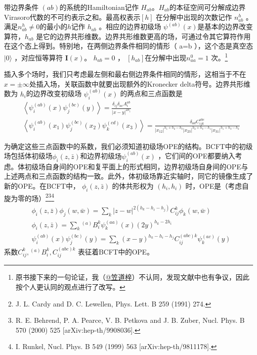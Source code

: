 带边界条件 $(ab) $的系统的Hamiltonian记作 $H_{a b} $。$ H_{ab} $的本征空间可分解成边界Virasoro代数的不可约表示之和。最高权表示$ [h]$ 在分解中出现的次数记作 $n_{a b}^{h}$ 。满足$ n_{a b}^{h} \neq 0 $的最小的$ h $记作 $h_{ab}$ 。相应的边界初级场 $\psi^{(a b)}(x) $是基本的边界改变算符，$ h_{ab}$ 是它的边界共形维数。边界共形维数更高的场，可通过令其它算符作用在这个态上得到。特别地，在两侧边界条件相同的情形（ a=b ），这个态是真空态 $|0\rangle$ ，对应恒等算符 $\boldsymbol{I}(x) $。 $h_{ab}=0$ ， $[h_{ab}] $在分解中出现$ n_{a a}^{0}=1$ 次。\footnote{原书接下来的一句论证，我（\href{https://www.zhihu.com/people/wo-bei-56}{@笠道梓}）不认同，发现文献中也有争议，因此按个人更认同的观点进行了改写。}

插入多个场时，我们只考虑最左侧和最右侧边界条件相同的情形，这相当于不在 $x=\pm \infty $处插入场，关联函数中就要出现额外的Kronecker delta符号。边界共形维数为 $h_i $的边界改变初级场 $\psi_{i}^{(a b)}(x)$ 的两点和三点函数是
\begin{align} &\left\langle\psi_{i}^{(a b)}(x) \psi_{j}^{(b c)}(y)\right\rangle=\frac{\delta_{i j} \delta_{a c} A_{i}^{a b}}{|x-y|^{2 h_{i}}}\\ &\left\langle\psi_{i}^{(a b)}\left(x_{1}\right) \psi_{j}^{(b c)}\left(x_{2}\right) \psi_{k}^{(c d)}\left(x_{3}\right)\right\rangle=\frac{\delta_{a d} C_{i j k}^{a b c}}{\left|x_{12}\right|^{h_{1}+h_{2}-h_{3}}\left|x_{23}\right|^{h_{2}+h_{3}-h_{1}}\left|x_{31}\right|^{h_{1}+h_{3}-h_{2}}} \end{align}

为确定这些三点函数中的系数，我们必须知道初级场OPE的结构。BCFT中的初级场包括体初级场$ \phi_{i}(z, \bar{z}) $和边界初级$场 \psi_{i}^{(a b)}(x)$ ，它们间的OPE都要纳入考虑。体初级场自身间的OPE和复平面上的形式相同，边界初级场自身间的OPE与上述两点和三点函数的结构一致。此外，体初级场靠近实轴时，同它的镜像生成了新的OPE。在BCFT中， $\phi_{i}(z, \bar{z})$ 的体共形权为 $\left(h_{i}, h_{i}\right)$ 时，OPE是（考虑自旋为零的场）\footnote{J. L. Cardy and D. C. Lewellen, Phys. Lett. B 259 (1991) 274.}\footnote{R. E. Behrend, P. A. Pearce, V. B. Petkova and J. B. Zuber, Nucl. Phys. B 570 (2000) 525 [arXiv:hep-th/9908036].}\footnote{I. Runkel, Nucl. Phys. B 549 (1999) 563 [arXiv:hep-th/9811178].}
\begin{align} &\phi_{i}(z, \bar{z}) \phi_{j}(w, \bar{w})=\sum_{k}|z-w|^{2\left(h_{k}-h_{i}-h_{j}\right)} C_{i j}^{k} \phi_{k}(w, \bar{w})\\ &\phi_{i}(z, \bar{z})=\sum_{k}{ }^{(a)} B_{i}^{k} \psi_{k}^{(a a)}(x)(2 y)^{h_{k}-2 h_{i}} \\ &\psi_{i}^{(a b)}(x) \psi_{j}^{(b c)}(y)=\sum_{k}(x-y)^{h_{k}-h_{i}-h_{j}} C_{i j}^{(a b c) k} \psi_{k}^{(a c)}(y) \end{align}
系数$ C_{i j}^{k}, {}^{(a)} B_{i}^{k}, C_{i j}^{(a b c) k}$ 表征着BCFT中的OPE。

